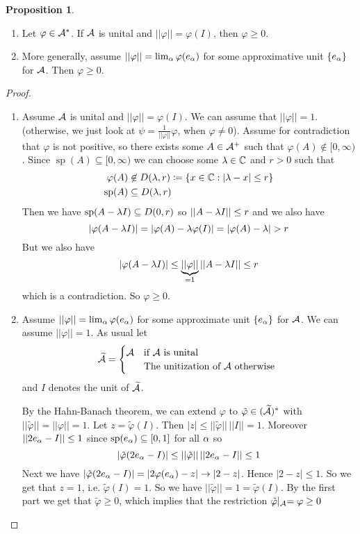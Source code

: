 \documentclass[10pt,english,a4paper]{article}
\theoremstyle{definition}
\newtheorem*{proposition}{Proposition}
\def\tAs{\widetilde{\As}}
\def\tvphi{\tilde{\varphi}}
\DeclareMathOperator{\Sp}{sp}
\def\vphi{\varphi}
\begin{document}
\begin{proposition}\leavevmode
\begin{enumerate}[(1)]
    \item 
    Let $\varphi \in \mathcal{A}^*$. If $\mathcal{A}$ is unital and $||\varphi|| = \varphi(I)$, 
then $\varphi \geq 0$.
\item More generally, assume $||\varphi|| = \lim_{\alpha}\varphi(e_{\alpha})$ for some
approximative unit $\{e_{\alpha}\}$ for $\mathcal{A}$. Then $\varphi \geq 0$.

\end{enumerate}

\end{proposition}
\begin{proof}
\begin{enumerate}[(1)]
    \item 
    Assume $\mathcal{A}$ is unital and $||\varphi|| = \varphi(I)$. We can assume that
$||\varphi||= 1$. (otherwise, we just look at $\psi =
\frac{1}{||\varphi||}\varphi$, when $\varphi\neq 0$). Assume for contradiction
that $\varphi$ is not positive, so there exists some $A\in \mathcal{A}^+$ such that
$\varphi(A)\not\in [0,\infty)$. 
Since $\Sp(A) \subseteq [0,\infty)$ we can choose some $\lambda \in \mathbb{C}$
and $r> 0$ such that 
\begin{align*}
\varphi(A) &\not\in D(\la, r)\coloneqq \{ x \in \C: |\la -x|\leq r \} \\ 
\Sp(A) &\subseteq D(\la,r)
\end{align*}
Then we have $\Sp(A -\la I) \subseteq D(0,r)$ so $||A-\lambda I||\leq r$ and 
we also have 
\[ |\varphi(A-\lambda I)|  = |\varphi(A) - \lambda \varphi(I)| = 
|\varphi(A) - \lambda| > r\]
But we also have
\[ |\varphi(A-\lambda I)| \leq \underbrace{||\varphi||}_{=1} ||A-\lambda I ||\leq r \]
which is a contradiction. So $\varphi \geq 0$.

\item 
Assume $||\varphi|| = \lim_{\alpha}\varphi(e_{\alpha})$ for some approximate 
unit $\{e_{\alpha}\}$ for $\mathcal{A}$. We can assume $||\varphi||=1$.
As usual let 
\[ \tAs = \begin{cases} \As &\text{if $\As$ is unital}\\ &\text{The unitization of $\As$ otherwise } \end{cases}\]
and $I$ denotes the unit of $\tAs$.

By the Hahn-Banach theorem, we can extend $\varphi$ to $\tilde{\varphi} \in 
(\tAs)^*$ with $||\tilde{\varphi}|| = ||\varphi|| = 1$. 
Let $z = \tvphi(I)$. Then $|z| \leq ||\tvphi||\, ||I||  = 1$. Moreover 
$||2e_{\alpha} - I||\leq 1$ since $\Sp(e_{\al}) \subseteq [0,1]$ for all $\alpha$
so 
\[ |\tvphi(2e_{\al} - I)| \leq ||\tvphi|| \, ||2e_{\al} - I||\leq 1 \]  
Next we have $|\tvphi(2e_{\al} - I)| = |2\vphi(e_{\al}) - z| \to |2-z|$. 
Hence  $|2-z|\leq 1$.
So we get that $z = 1$, i.e. $\tvphi(I) = 1$.
So we have $||\tvphi|| = 1 = \tvphi(I)$. By the first part we get that 
$\tvphi \geq 0$, which implies that the restriction $\tvphi\lvert_{\As} = \vphi \geq 0$
\end{enumerate}
\end{proof}
\end{document}
